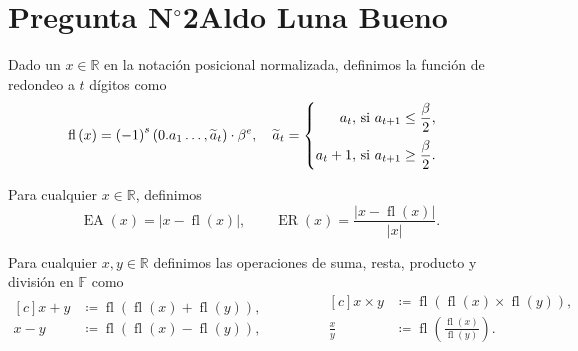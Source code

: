 \section{Pregunta N$^{\circ}$2\qquad Aldo Luna Bueno}

\begin{frame}
	\begin{definition}[Redondeo]
		Dado un $x\in\mathbb{R}$ en la notación posicional normalizada,
		definimos la función de redondeo a $t$ dígitos como
		\begin{equation*}
			\operatorname{fl}\left(x\right)=
			{\left(-1\right)}^{s}
			\left(
			0.a_{1}\dotsc,\widetilde{a}_{t}
			\right)\cdot
			\beta^{e},\quad
			\widetilde{a}_{t}=
			\begin{cases}
				\begin{aligned}
					a_{t},
					 & \text{ si }a_{t+1}\leq\frac{\beta}{2}, \\[\baselineskip]
					a_{t}+1,
					 & \text{ si }a_{t+1}\geq\frac{\beta}{2}.
				\end{aligned}
			\end{cases}
		\end{equation*}
	\end{definition}

	\begin{definition}
		Para cualquier $x\in\mathbb{R}$, definimos
		\begin{equation*}
			\operatorname{EA}\left(x\right)=
			\left|
			x-
			\operatorname{fl}\left(x\right)\right|,\qquad
			\operatorname{ER}\left(x\right)=
			\frac{
				\left|
				x-
				\operatorname{fl}\left(x\right)\right|
			}{
				\left|
				x
				\right|
			}.
		\end{equation*}
	\end{definition}

	\begin{definition}
		Para cualquier $x,y\in\mathbb{R}$ definimos las operaciones de
		suma, resta, producto y división en $\mathbb{F}$ como
		\begin{equation*}
			\begin{aligned}[c]
				x+y & \coloneqq
				\operatorname{fl}
				\left(
				\operatorname{fl}\left(x\right)+
				\operatorname{fl}\left(y\right)
				\right),        \\
				x-y & \coloneqq
				\operatorname{fl}
				\left(
				\operatorname{fl}\left(x\right)-
				\operatorname{fl}\left(y\right)
				\right),
			\end{aligned}
			\qquad\qquad
			\begin{aligned}[c]
				x\times y   & \coloneqq
				\operatorname{fl}
				\left(
				\operatorname{fl}\left(x\right)\times
				\operatorname{fl}\left(y\right)
				\right),                \\
				\frac{x}{y} & \coloneqq
				\operatorname{fl}
				\left(
				\frac{
					\operatorname{fl}\left(x\right)
				}{
					\operatorname{fl}\left(y\right)
				}
				\right).
			\end{aligned}
		\end{equation*}
	\end{definition}
\end{frame}

